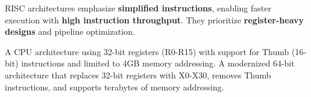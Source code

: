 \begin{NxSSBox}
	\begin{NxIDBox}
		RISC architectures emphasize \textbf{simplified instructions}, enabling faster execution with \textbf{high instruction throughput}. They prioritize \textbf{register-heavy designs} and pipeline optimization.
	\end{NxIDBox}
	\begin{NxIDBoxL}
		 A CPU architecture using 32-bit registers (R0-R15) with support for Thumb (16-bit) instructions and limited to 4GB memory addressing.
		 A modernized 64-bit architecture that replaces 32-bit registers with X0-X30, removes Thumb instructions, and supports terabytes of memory addressing.
	\end{NxIDBoxL}
\end{NxSSBox}



%
%
%

